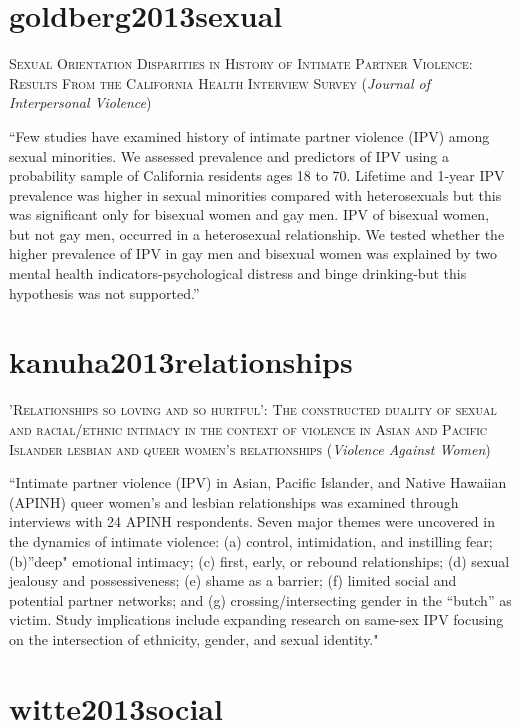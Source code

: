 \documentclass[]{tufte-handout}
\begin{document}
\section{\texorpdfstring{\textcolor[HTML]{5b0057}{goldberg2013sexual}}{}}\label{section-49}

\textsc{\large{Sexual Orientation Disparities in History of Intimate Partner Violence: Results From the California Health Interview Survey}}
(\emph{Journal of Interpersonal Violence})

``Few studies have examined history of intimate partner violence (IPV)
among sexual minorities. We assessed prevalence and predictors of IPV
using a probability sample of California residents ages 18 to 70.
Lifetime and 1-year IPV prevalence was higher in sexual minorities
compared with heterosexuals but this was significant only for bisexual
women and gay men. IPV of bisexual women, but not gay men, occurred in a
heterosexual relationship. We tested whether the higher prevalence of
IPV in gay men and bisexual women was explained by two mental health
indicators-psychological distress and binge drinking-but this hypothesis
was not supported.''

\section{\texorpdfstring{\textcolor[HTML]{5b0057}{kanuha2013relationships}}{}}\label{section-50}

\textsc{\large{'Relationships so loving and so hurtful': The constructed duality of sexual and racial/ethnic intimacy in the context of violence in Asian and Pacific Islander lesbian and queer women's relationships}}
(\emph{Violence Against Women})

``Intimate partner violence (IPV) in Asian, Pacific Islander, and Native
Hawaiian (APINH) queer women's and lesbian relationships was examined
through interviews with 24 APINH respondents. Seven major themes were
uncovered in the dynamics of intimate violence: (a) control,
intimidation, and instilling fear; (b)''deep" emotional intimacy; (c)
first, early, or rebound relationships; (d) sexual jealousy and
possessiveness; (e) shame as a barrier; (f) limited social and potential
partner networks; and (g) crossing/intersecting gender in the ``butch''
as victim. Study implications include expanding research on same-sex IPV
focusing on the intersection of ethnicity, gender, and sexual identity."

\section{\texorpdfstring{\textcolor[HTML]{5b0057}{witte2013social}}{}}\label{section-51}
\end{document}
